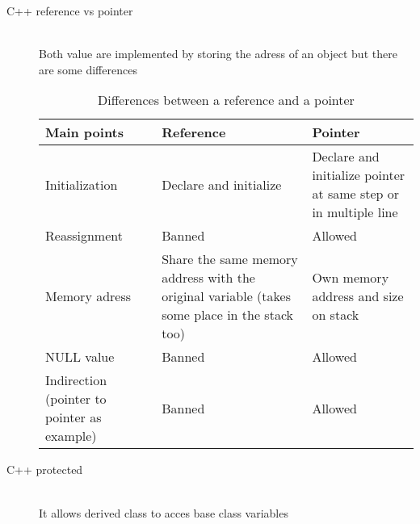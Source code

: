 \documentclass{article}
\begin{document}
\begin{description}
    \item[C++ reference vs pointer] \mbox{}\\
    Both value are implemented by storing the adress of an object but there are some differences
    \begin{table}[htb]
        \caption {Differences between a reference and a pointer}
        \begin{tabular}{ | p{4cm} | p{4cm} | p{4cm} | }
            \hline
            \textbf{Main points} & \textbf{Reference} & \textbf{Pointer} \\
            \hline
            Initialization & Declare and initialize & Declare and initialize pointer at same step or in multiple line \\
            \hline
            Reassignment & Banned & Allowed \\
            \hline
            Memory adress & Share the same memory address with the original variable (takes some place in the stack too) & Own memory address and size on stack\\
            \hline
            NULL value & Banned & Allowed \\
            \hline
            Indirection (pointer to pointer as example) & Banned & Allowed\\
            \hline
           \end{tabular}
        \end{table}

    \item[C++ protected] \mbox{}\\
    It allows derived class to acces base class variables 

\end{description}
\end{document}
